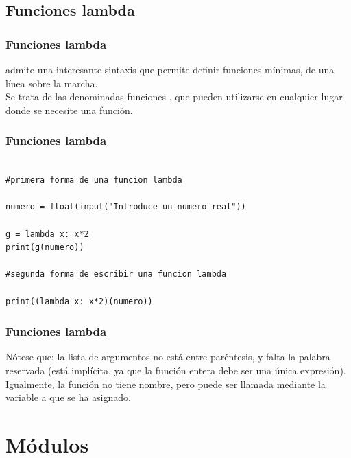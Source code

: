 \subsection{Funciones lambda}
\begin{frame}
\frametitle{Funciones lambda}
\python{} admite una interesante sintaxis que permite definir funciones mínimas, de una línea sobre la marcha. 
\\
\bigskip
Se trata de las denominadas funciones , que pueden utilizarse en cualquier lugar donde se necesite una función.
\end{frame}
\begin{frame}
\frametitle{Funciones lambda}
\begin{lstlisting}[style=codigopython]

#primera forma de una funcion lambda

numero = float(input("Introduce un numero real"))

g = lambda x: x*2
print(g(numero))

#segunda forma de escribir una funcion lambda

print((lambda x: x*2)(numero)) 
\end{lstlisting}
\end{frame}
\begin{frame}
\frametitle{Funciones lambda}
Nótese que: la lista de argumentos no está entre paréntesis, y falta la palabra reservada  (está implícita, ya que la función entera debe ser una única expresión). 
\\
\bigskip
Igualmente, la función no tiene nombre, pero puede ser llamada mediante la variable a que se ha asignado.
\end{frame}
\section{Módulos}
